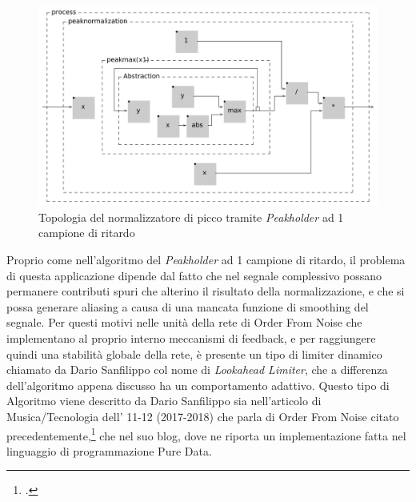 \clearpage

\begin{figure}[h!]
\begin{center}
    \includegraphics[width=14cm]{figures/PeakNormalizationIIR.pdf}
    \caption {Topologia del normalizzatore di picco tramite \textit{Peakholder} ad 1 campione di ritardo}
\end{center}
\vspace{0.5cm}
\end{figure}
    
Proprio come nell'algoritmo del \textit{Peakholder} ad 1 campione di ritardo, 
il problema di questa applicazione dipende dal fatto che nel segnale
complessivo possano permanere contributi spuri che alterino il risultato
della normalizzazione, e che si possa generare aliasing a causa di una mancata
funzione di smoothing del segnale.
Per questi motivi nelle unità della rete di Order From Noise 
che implementano al proprio interno meccanismi di feedback,
e per raggiungere quindi una stabilità globale della rete,
è presente un tipo di limiter dinamico chiamato da Dario Sanfilippo
col nome di \textit{Lookahead Limiter}, che a differenza dell'algoritmo
appena discusso ha un comportamento adattivo.
Questo tipo di Algoritmo viene descritto da Dario Sanfilippo sia nell'articolo 
di Musica/Tecnologia dell' 11-12 (2017-2018) che parla di Order From Noise 
citato precedentemente,\footcite{sanfilippo_time-variant_2018}
che nel suo blog, dove ne riporta un implementazione fatta nel linguaggio di programmazione
Pure Data.

